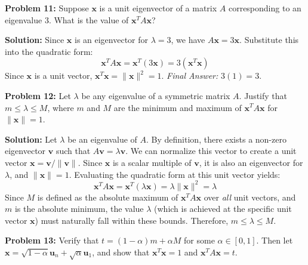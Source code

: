\documentclass[11pt, letterpaper]{article}
\theoremstyle{definition}
\theoremstyle{remark}
\begin{document}
\textbf{Problem 11:} Suppose $\mathbf{x}$ is a unit eigenvector of a matrix $A$ corresponding to an eigenvalue 3. What is the value of $\mathbf{x}^T A \mathbf{x}$?

\textbf{Solution:}
Since $\mathbf{x}$ is an eigenvector for $\lambda = 3$, we have $A\mathbf{x} = 3\mathbf{x}$.
Substitute this into the quadratic form:
\[ \mathbf{x}^T A \mathbf{x} = \mathbf{x}^T (3\mathbf{x}) = 3(\mathbf{x}^T\mathbf{x}) \]
Since $\mathbf{x}$ is a unit vector, $\mathbf{x}^T\mathbf{x} = \|\mathbf{x}\|^2 = 1$.
\textit{Final Answer:} $3(1) = 3$.

\vspace{1em}
\textbf{Problem 12:} Let $\lambda$ be any eigenvalue of a symmetric matrix $A$. Justify that $m \le \lambda \le M$, where $m$ and $M$ are the minimum and maximum of $\mathbf{x}^T A \mathbf{x}$ for $\|\mathbf{x}\|=1$.

\textbf{Solution:}
Let $\lambda$ be an eigenvalue of $A$. By definition, there exists a non-zero eigenvector $\mathbf{v}$ such that $A\mathbf{v} = \lambda\mathbf{v}$. We can normalize this vector to create a unit vector $\mathbf{x} = \mathbf{v} / \|\mathbf{v}\|$. Since $\mathbf{x}$ is a scalar multiple of $\mathbf{v}$, it is also an eigenvector for $\lambda$, and $\|\mathbf{x}\| = 1$.
Evaluating the quadratic form at this unit vector yields:
\[ \mathbf{x}^T A \mathbf{x} = \mathbf{x}^T (\lambda\mathbf{x}) = \lambda \|\mathbf{x}\|^2 = \lambda \]
Since $M$ is defined as the absolute maximum of $\mathbf{x}^T A \mathbf{x}$ over \textit{all} unit vectors, and $m$ is the absolute minimum, the value $\lambda$ (which is achieved at the specific unit vector $\mathbf{x}$) must naturally fall within these bounds. Therefore, $m \le \lambda \le M$.

\vspace{1em}
\textbf{Problem 13:} Verify that $t = (1-\alpha)m + \alpha M$ for some $\alpha \in [0,1]$. Then let $\mathbf{x} = \sqrt{1-\alpha}\mathbf{u}_n + \sqrt{\alpha}\mathbf{u}_1$, and show that $\mathbf{x}^T\mathbf{x} = 1$ and $\mathbf{x}^T A \mathbf{x} = t$.
\end{document}
